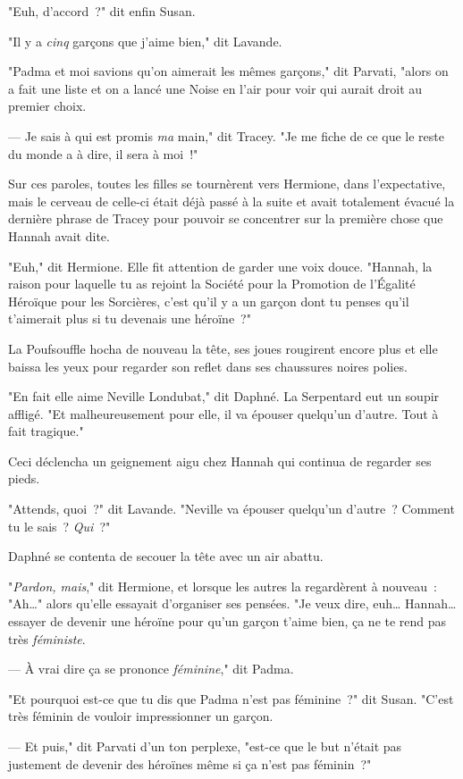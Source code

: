 "Euh, d'accord~?" dit enfin Susan.

"Il y a \emph{cinq} garçons que j'aime bien," dit Lavande.

"Padma et moi savions qu'on aimerait les mêmes garçons," dit Parvati, "alors on a fait une liste et on a lancé une Noise en l'air pour voir qui aurait droit au premier choix.

--- Je sais à qui est promis \emph{ma} main," dit Tracey. "Je me fiche de ce que le reste du monde a à dire, il sera à moi~!"

Sur ces paroles, toutes les filles se tournèrent vers Hermione, dans l'expectative, mais le cerveau de celle-ci était déjà passé à la suite et avait totalement évacué la dernière phrase de Tracey pour pouvoir se concentrer sur la première chose que Hannah avait dite.

"Euh," dit Hermione. Elle fit attention de garder une voix douce. "Hannah, la raison pour laquelle tu as rejoint la Société pour la Promotion de l'Égalité Héroïque pour les Sorcières, c'est qu'il y a un garçon dont tu penses qu'il t'aimerait plus si tu devenais une héroïne~?"

La Poufsouffle hocha de nouveau la tête, ses joues rougirent encore plus et elle baissa les yeux pour regarder son reflet dans ses chaussures noires polies.

"En fait elle aime Neville Londubat," dit Daphné. La Serpentard eut un soupir affligé. "Et malheureusement pour elle, il va épouser quelqu'un d'autre. Tout à fait tragique."

Ceci déclencha un geignement aigu chez Hannah qui continua de regarder ses pieds.

"Attends, quoi~?" dit Lavande. "Neville va épouser quelqu'un d'autre~? Comment tu le sais~? \emph{Qui}~?"

Daphné se contenta de secouer la tête avec un air abattu.

"\emph{Pardon, mais}," dit Hermione, et lorsque les autres la regardèrent à nouveau~: "Ah…" alors qu'elle essayait d'organiser ses pensées. "Je veux dire, euh… Hannah… essayer de devenir une héroïne pour qu'un garçon t'aime bien, ça ne te rend pas très \emph{féministe}.

--- À vrai dire ça se prononce \emph{féminine}," dit Padma.

"Et pourquoi est-ce que tu dis que Padma n'est pas féminine~?" dit Susan. "C'est très féminin de vouloir impressionner un garçon.

--- Et puis," dit Parvati d'un ton perplexe, "est-ce que le but n'était pas justement de devenir des héroïnes même si ça n'est pas féminin~?"

